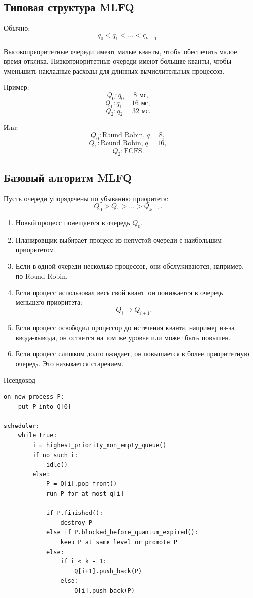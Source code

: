 \documentclass[12pt,a4paper]{article}
\begin{document}
\subsection{Типовая структура MLFQ}

Обычно:
\[
q_0 < q_1 < \ldots < q_{k-1}.
\]

Высокоприоритетные очереди имеют малые кванты, чтобы обеспечить малое время отклика. Низкоприоритетные очереди имеют большие кванты, чтобы уменьшить накладные расходы для длинных вычислительных процессов.

Пример:
\[
Q_0: q_0 = 8\text{ мс},
\]
\[
Q_1: q_1 = 16\text{ мс},
\]
\[
Q_2: q_2 = 32\text{ мс}.
\]

Или:
\[
Q_0: \text{Round Robin, } q=8,
\]
\[
Q_1: \text{Round Robin, } q=16,
\]
\[
Q_2: \text{FCFS}.
\]

\subsection{Базовый алгоритм MLFQ}

Пусть очереди упорядочены по убыванию приоритета:
\[
Q_0 > Q_1 > \ldots > Q_{k-1}.
\]

\begin{enumerate}
    \item Новый процесс помещается в очередь $Q_0$.
    \item Планировщик выбирает процесс из непустой очереди с наибольшим приоритетом.
    \item Если в одной очереди несколько процессов, они обслуживаются, например, по Round Robin.
    \item Если процесс использовал весь свой квант, он понижается в очередь меньшего приоритета:
    \[
    Q_i \rightarrow Q_{i+1}.
    \]
    \item Если процесс освободил процессор до истечения кванта, например из-за ввода-вывода, он остается на том же уровне или может быть повышен.
    \item Если процесс слишком долго ожидает, он повышается в более приоритетную очередь. Это называется старением.
\end{enumerate}

Псевдокод:

\begin{lstlisting}
on new process P:
    put P into Q[0]

scheduler:
    while true:
        i = highest_priority_non_empty_queue()
        if no such i:
            idle()
        else:
            P = Q[i].pop_front()
            run P for at most q[i]

            if P.finished():
                destroy P
            else if P.blocked_before_quantum_expired():
                keep P at same level or promote P
            else:
                if i < k - 1:
                    Q[i+1].push_back(P)
                else:
                    Q[i].push_back(P)
\end{lstlisting}
\end{document}
